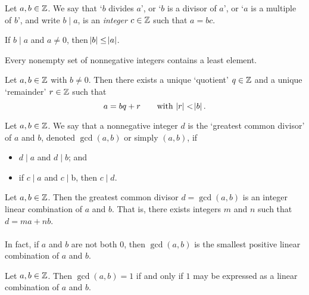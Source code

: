 \documentclass[../Aluffi_Algebra.tex]{subfiles}
\begin{document}
\begin{defn}
    Let \(a, b \in \mathbb{Z}\). We say that `\(b\) divides \(a\)', or `\(b\) is a divisor of \(a\)',
    or `\(a\) is a multiple of \(b\)', and write \(b \mid a\), is an \emph{integer} \(c \in \mathbb{Z}\) such that \(a = bc\).
\end{defn}

\begin{lem}
    If \(b \mid a\) and \(a \neq 0\), then \(\abs{b} \leq \abs{a}\).
\end{lem}

\begin{fact}
    Every nonempty set of nonnegative integers contains a least element.
\end{fact}

\begin{thm}
    Let \(a, b \in \mathbb{Z}\) with \(b \neq 0\). Then there exists a unique `quotient' \(q \in \mathbb{Z}\) and a 
    unique `remainder' \(r \in \mathbb{Z}\) such that
    \[ a = bq + r \qquad\text{with } \abs{r} < \abs{b}. \]
\end{thm}


\begin{defn}
    Let \(a,b \in \mathbb{Z}\). We say that a nonnegative integer \(d\) is the `greatest common divisor' of \(a\) and \(b\),
    denoted \(\gcd(a,b)\) or simply \((a,b)\), if
    \begin{itemize}
        \item \(d \mid a\) and \(d \mid b\); and
        \item if \(c \mid a\) and \(c \mid \)b, then \(c \mid d\).
    \end{itemize}
\end{defn}


\begin{thm}
    Let \(a, b \in \mathbb{Z}\). Then the greatest common divisor \(d = \gcd(a,b)\) is an integer linear combination of \(a\)
    and \(b\). That is, there exists integers \(m\) and \(n\) such that \(d = ma + nb\).
    \\ \\
    In fact, if \(a\) and \(b\) are not both 0, then \(\gcd(a,b)\) is the smallest positive linear combination
    of \(a\) and \(b\).
\end{thm}

\begin{cor}
    Let \(a, b \in \mathbb{Z}\). Then \(\gcd(a,b) = 1\) if and only if \(1\) may be expressed as a linear combination of \(a\) and \(b\).
\end{cor}
\end{document}
